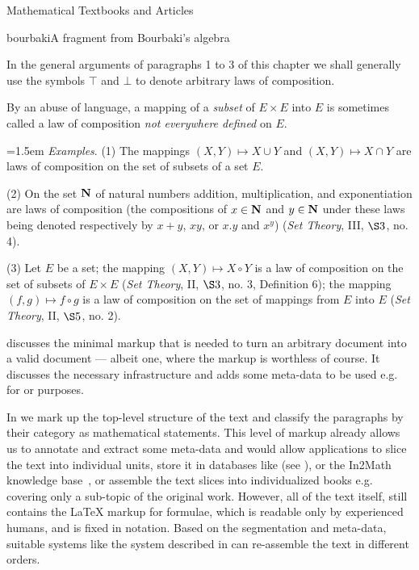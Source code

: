 \begin{omgroup}[short=Textbooks and Articles,id=algebra]{Mathematical Textbooks and Articles}
\begin{myfig}{bourbaki}{A fragment from Bourbaki's algebra~}
{\begin{minipage}{11cm}
      In the general arguments of paragraphs 1 to 3 of this chapter we shall generally use
      the symbols $\top$ and $\bot$ to denote arbitrary laws of composition.
      
      By an abuse of language, a mapping of a {\emph{subset}} of $E\times E$ into $E$ is
      sometimes called a law of composition {\emph{not everywhere defined}} on $E$.
      \vspace{1em}

      \strut\hfill
      \begin{minipage}{11cm}\parindent=1.5em
        {\emph{Examples}}. (1) The mappings $(X,Y)\mapsto X\cup Y$ and $(X,Y)\mapsto
        X\cap Y$ are laws of composition on the set of subsets of a set $E$.
        
        (2) On the set $\bf N$ of natural numbers addition, multiplication, and
        exponentiation are laws of composition (the compositions of $x\in{\bf N}$
        and $y\in{\bf N}$ under these laws being denoted respectively by $x+y$,
        $xy$, or $x.y$ and $x^y$) ({\em{Set Theory}}, III, $\S3$, no. 4).
  
        (3) Let $E$ be a set; the mapping $(X,Y)\mapsto X\circ Y$ is a law of
        composition on the set of subsets of $E\times E$ ({\emph{Set Theory}}, II,
        $\S3$, no. 3, Definition 6); the mapping $(f,g)\mapsto f\circ g$ is a law
        of composition on the set of mappings from $E$ into $E$ ({\emph{Set Theory}},
        II, $\S5$, no. 2).
      \end{minipage}
    \end{minipage}}
\end{myfig}

{} discusses the minimal markup that is needed to turn an
arbitrary document into a valid {\omdoc} document --- albeit one, where the markup is
worthless of course. It discusses the necessary {\xml} infrastructure and adds some
meta-data to be used e.g. for {} or
 purposes.

In {} we mark up the top-level structure of the text and
classify the paragraphs by their category as mathematical statements.  This level
of markup already allows us to annotate and extract some meta-data and would allow
applications to slice the text into individual units, store it in databases like
{\mbase} (see {}), or the In2Math knowledge
base~\cite{Dahn:sbt01,BauBlo:adtmpd01}, or assemble the text slices into
individualized books e.g. covering only a sub-topic of the original work.
However, all of the text itself, still contains the {\LaTeX} markup for formulae,
which is readable only by experienced humans, and is fixed in notation.  Based on
the segmentation and meta-data, suitable systems like the {\activemath} system
described in {} can re-assemble the text in different orders.
   

\end{omgroup}
